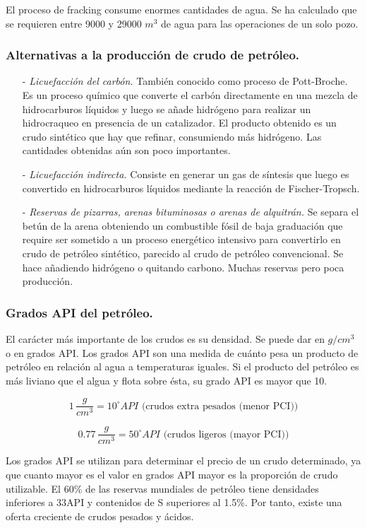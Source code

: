 				El proceso de fracking consume enormes cantidades de agua. Se ha calculado que se requieren entre 9000 y 29000 $m^3$ de agua para las operaciones de un solo pozo.
				
		\subsubsection{Alternativas a la producción de crudo de petróleo.}
			\begin{itemize}
				\item[-] \textit{Licuefacción del carbón.}
					También conocido como proceso de Pott-Broche. Es un proceso químico que converte el carbón directamente en una mezcla de hidrocarburos líquidos y luego se añade hidrógeno para realizar un hidrocraqueo en presencia de un catalizador. El producto obtenido es un crudo sintético que hay que refinar, consumiendo más hidrógeno. Las cantidades obtenidas aún son poco importantes.
				\item[-] \textit{Licuefacción indirecta.}
					Consiste en generar un gas de síntesis que luego es convertido en hidrocarburos líquidos mediante la reacción de Fischer-Tropsch.
				\item[-] \textit{Reservas de pizarras, arenas bituminosas o arenas de alquitrán.}
					Se separa el betún de la arena obteniendo un combustible fósil de baja graduación que require ser sometido a un proceso energético intensivo para convertirlo en crudo de petróleo sintético, parecido al crudo de petróleo convencional. Se hace añadiendo hidrógeno o quitando carbono. Muchas reservas pero poca producción.
			\end{itemize}
			
		\subsubsection{Grados API del petróleo.}
			El carácter más importante de los crudos es su densidad. Se puede dar en $g/cm^3$ o en grados API. Los grados API son una medida de cuánto pesa un producto de petróleo en relación al agua a temperaturas iguales. Si el producto del petróleo es más liviano que el algua y flota sobre ésta, su grado API es mayor que 10.
			
			
			\[1\,\dfrac{g}{cm^3} = 10^\circ API \text{ (crudos extra pesados (menor PCI))}\]
			
			\[0.77\,\dfrac{g}{cm^3} = 50^\circ API \text{ (crudos ligeros (mayor PCI))}\]
			
			
			Los grados API se utilizan para determinar el precio de un crudo determinado, ya que cuanto mayor es el valor en grados API mayor es la proporción de crudo utilizable. El 60\% de las reservas mundiales de petróleo tiene densidades inferiores a 33\textdegree API y contenidos de S superiores al 1.5\%. Por tanto, existe una oferta creciente de crudos pesados y ácidos.
			

